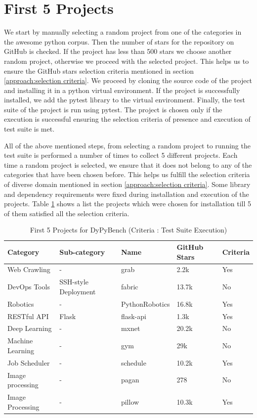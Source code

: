 \section{First 5 Projects}
\label{impl:first five}
We start by manually selecting a random project from one of the categories in the awesome python corpus.
Then the number of stars for the repository on GitHub is checked. 
If the project has less than 500 stars we choose another random project, otherwise we proceed with the selected project.
This helps us to ensure the GitHub stars selection criteria mentioned in section \ref{approach:selection criteria}.
We proceed by cloning the source code of the project and installing it in a python virtual environment.
If the project is successfully installed, we add the pytest library to the virtual environment.
Finally, the test suite of the project is run using pytest. 
The project is chosen only if the execution is successful ensuring the selection criteria of presence and execution of test suite is met.

All of the above mentioned steps, from selecting a random project to running the test suite is performed a number of times to collect 5 different projects. 
Each time a random project is selected, we ensure that it does not belong to any of the categories that have been chosen before.
This helps us fulfill the selection criteria of diverse domain mentioned in section \ref{approach:selection criteria}.
Some library and dependency requirements were fixed during installation and execution of the projects.
Table \ref{table:first_5_projects} shows a list the projects which were chosen for installation till 5 of them satisfied all the selection criteria.

\begin{table}[ht]
    \centering
    \begin{tabular}{lllll}
    \hline
    \textbf{Category} & \textbf{Sub-category} & \textbf{Name} & \textbf{GitHub Stars} & \textbf{Criteria}\\
    \hline
    Web Crawling & - & grab & 2.2k & Yes\\
    DevOps Tools & SSH-style Deployment & fabric & 13.7k & No\\
    Robotics & - & PythonRobotics & 16.8k & Yes\\
    RESTful API & Flask & flask-api & 1.3k & Yes\\
    Deep Learning & - & mxnet & 20.2k & No\\
    Machine Learning & - & gym & 29k & No\\
    Job Scheduler & - & schedule & 10.2k & Yes\\
    Image processing & - & pagan & 278 & No\\
    Image Processing & - & pillow & 10.3k & Yes\\
    \hline
    \end{tabular}
    \caption{First 5 Projects for DyPyBench (Criteria : Test Suite Execution)}
    \label{table:first_5_projects}
\end{table}

